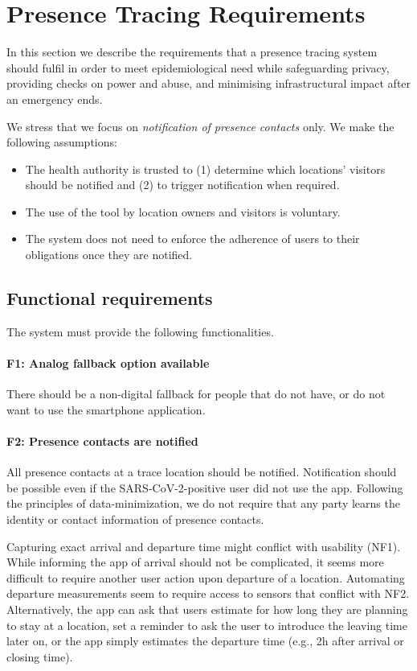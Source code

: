 \section{Presence Tracing Requirements}\label{sec:requirements}

In this section we describe the requirements that a presence tracing system should fulfil in order to meet epidemiological need while safeguarding privacy, providing checks on power and abuse, and minimising infrastructural impact after an emergency ends.


We stress that we focus on \emph{notification of presence contacts} only. We make the following assumptions:
\begin{itemize}[topsep=0pt, partopsep=0pt]
\item The health authority is trusted to (1) determine which locations' visitors should be notified and (2) to trigger notification when required.
\item The use of the tool by location owners and visitors is voluntary.
\item The system does not need to enforce the adherence of users to their obligations once they are notified.
\end{itemize} 

\subsection{Functional requirements}
The system must provide the following functionalities.

\paragraph{F1: Analog fallback option available} There should be a non-digital fallback for people that do not have, or do not want to use the smartphone application.

\paragraph{F2: Presence contacts are notified} All presence contacts at a trace location should be notified.
Notification should be possible even if the SARS-CoV-2-positive user did not use the app. Following the principles of data-minimization, we do not require that any party learns the identity or contact information of presence contacts.

 Capturing exact arrival and departure time might conflict with usability (NF1). While informing the app of arrival should not be complicated, it seems more difficult to require another user action upon departure of a location. Automating departure measurements seem to require access to sensors that conflict with NF2. Alternatively, the app can ask that users estimate for how long they are planning to stay at a location, set a reminder to ask the user to introduce the leaving time later on, or the app simply estimates the departure time (e.g., 2h after arrival or closing time).

